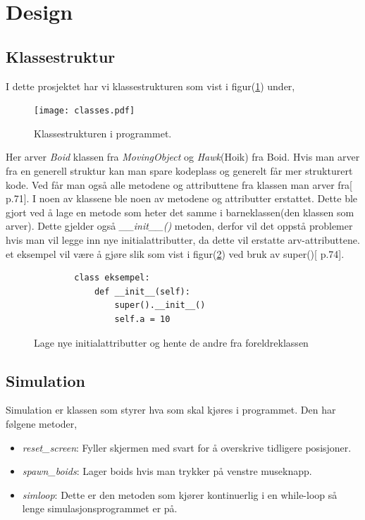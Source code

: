 {\section{Design}
\subsection{Klassestruktur}
I dette prosjektet har vi klassestrukturen som vist i figur(\ref{klassestrukturen}) under,
\begin{figure}[hbt!]
{\centering
    \texttt{[image: classes.pdf]}
    \caption{Klassestrukturen i programmet.}
    \label{klassestrukturen}
\par}
\end{figure}

Her arver \emph{Boid} klassen fra \emph{MovingObject} og \emph{Hawk}(Hoik) fra Boid. Hvis man arver fra en generell struktur kan man spare kodeplass og generelt får mer strukturert kode. Ved får man også alle metodene og attributtene fra klassen man arver fra[\cite{Dustyphil} p.71]. I noen av klassene ble noen av metodene og attributter erstattet. Dette ble gjort ved å lage en metode som heter det samme i barneklassen(den klassen som arver). Dette gjelder også \emph{\_\_init\_\_()} metoden, derfor vil det oppstå problemer hvis man vil legge inn nye initialattributter, da dette vil erstatte arv-attributtene. et eksempel vil være å gjøre slik som vist i figur(\ref{nye_att}) ved bruk av super()[\cite{Dustyphil} p.74].

\begin{figure}[hbt!]
    \begin{lstlisting}
        class eksempel:
            def __init__(self):
                super().__init__()
                self.a = 10
    \end{lstlisting}
\caption{Lage nye initialattributter og hente de andre fra foreldreklassen}
\label{nye_att}
\end{figure}

\subsection{Simulation}

Simulation er klassen som styrer hva som skal kjøres i programmet. Den har følgene metoder,\\

\begin{itemize}
    \item \emph{reset\_screen}: Fyller skjermen med svart for å overskrive tidligere posisjoner.
    \item \emph{spawn\_boids}: Lager boids hvis man trykker på venstre museknapp.
    \item \emph{simloop}: Dette er den metoden som kjører kontinuerlig i en while-loop så lenge simulasjonsprogrammet er på.
\end{itemize}

}
